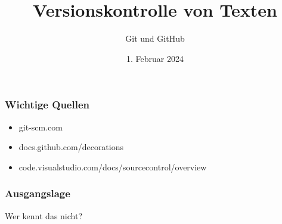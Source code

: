 \documentclass[table]{beamer}
\title{Versionskontrolle von Texten}
\subtitle{Git und GitHub}
\date{1. Februar 2024}
\begin{document}
    \frame{\titlepage}

    \begin{frame}
        \frametitle{Wichtige Quellen}
        \begin{itemize}
            \item git-scm.com
            \item docs.github.com/decorations
            \item code.visualstudio.com/docs/sourcecontrol/overview
        \end{itemize}
    \end{frame}

    \begin{frame}
        \frametitle{Ausgangslage}
        Wer kennt das nicht?

        \vspace*{5mm}

    \end{frame}
\end{document}
